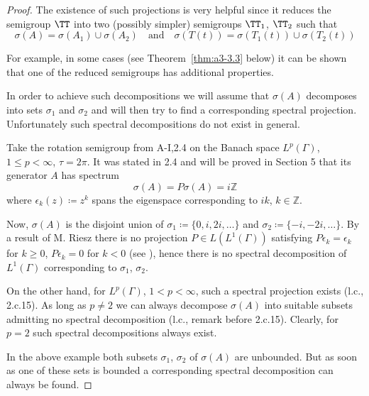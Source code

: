 \begin{proof}
The existence of such projections is very helpful since it reduces the semigroup $\TT$ into two (possibly simpler) semigroups $\TT_{1}$, $\TT_{2}$ such that
\[
\sigma(A) = \sigma(A_{1}) \cup \sigma(A_{2}) \quad \text{and} \quad \sigma(T(t)) = \sigma(T_{1}(t)) \cup \sigma(T_{2}(t))
\]

For example, in some cases (see Theorem~\ref{thm:a3-3.3} below) it can be shown that one of the reduced semigroups has additional properties.

In order to achieve such decompositions we will assume that $\sigma(A)$ decomposes into sets $\sigma_{1}$ and $\sigma_{2}$ and will then try to find a corresponding spectral projection.
Unfortunately such spectral decompositions do not exist in general.

\begin{example}\label{ex:a3-3.2}

Take the rotation semigroup from A-I,2.4 on the Banach space $L^{p}(\Gamma)$, $1 \leq p < \infty$, $\tau = 2\pi$.
It was stated in 2.4 and will be proved in Section 5 that its generator $A$ has spectrum
\[
\sigma(A) = P\sigma(A) = i\mathbb{Z}
\]
where $\epsilon_{k}(z) \coloneqq z^{k}$ spans the eigenspace corresponding to $ik$, $k \in \mathbb{Z}$.

Now, $\sigma(A)$ is the disjoint union of $\sigma_{1} \coloneqq \{0,i,2i,\ldots\}$ and $\sigma_{2} \coloneqq \{-i,-2i,\ldots\}$.
By a result of M. Riesz there is no projection $P \in L(L^{1}(\Gamma))$ satisfying $P\epsilon_{k} = \epsilon_{k}$ for $k \geq 0$, $P\epsilon_{k} = 0$ for $k < 0$ (see \citet[p.165]{lindenstrausstzafriri:1979}), hence there is no spectral decomposition of $L^{1}(\Gamma)$ corresponding to $\sigma_{1}$, $\sigma_{2}$.

On the other hand, for $L^{p}(\Gamma)$, $1 < p < \infty$, such a spectral projection exists (l.c., 2.c.15).
As long as $p \neq 2$ we can always decompose $\sigma(A)$ into suitable subsets admitting no spectral decomposition (l.c., remark before 2.c.15).
Clearly, for $p = 2$ such spectral decompositions always exist.
\end{example}

\newpage

In the above example both subsets $\sigma_{1}$, $\sigma_{2}$ of $\sigma(A)$ are unbounded.
But as soon as one of these sets is bounded a corresponding spectral decomposition can always be found.


\end{proof}
